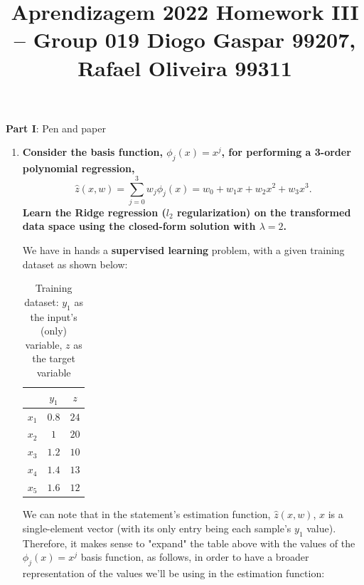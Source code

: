 \documentclass[12pt]{article}
\title{\large{Aprendizagem 2022}\vskip 0.2cm Homework III -- Group 019\vskip 0.2cm Diogo Gaspar 99207, Rafael Oliveira 99311}
\date{}
\begin{document}
\maketitle
\center\large{\vskip -2.5cm\textbf{Part I}: Pen and paper}
\begin{enumerate}[leftmargin=\labelsep]

  \item \textbf{Consider the basis function, $\phi_j(x) = x^j$, for performing a 3-order polynomial regression,
          $$
            \hat{z}(x, w) = \sum_{j=0}^3 w_j \phi_j(x) = w_0 + w_1 x + w_2 x^2 + w_3 x^3.
          $$
          Learn the Ridge regression ($l_2$ regularization) on the transformed data space
          using the closed-form solution with $\lambda = 2$.
        }

        We have in hands a \textbf{supervised learning} problem, with a given training
        dataset as shown below:

        \begin{table}[H]
          \centering
          \begin{tabular}{c|c|c}
                  & $y_1$ & $z$  \\ \hline
            $x_1$ & $0.8$ & $24$ \\
            $x_2$ & $1$   & $20$ \\
            $x_3$ & $1.2$ & $10$ \\
            $x_4$ & $1.4$ & $13$ \\
            $x_5$ & $1.6$ & $12$
          \end{tabular}
          \caption{Training dataset: $y_1$ as the input's (only) variable, $z$ as the target variable}
          \label{tab:training-dataset}
        \end{table}

        We can note that in the statement's estimation function, $\hat{z}(x, w)$, $x$ is a single-element vector
        (with its only entry being each sample's $y_1$ value). Therefore, it makes
        sense to "expand" the table above with the values of the $\phi_j(x) = x^j$ basis function,
        as follows, in order to have a broader representation of the values we'll be using in the
        estimation function:


\end{enumerate}
\end{document}
